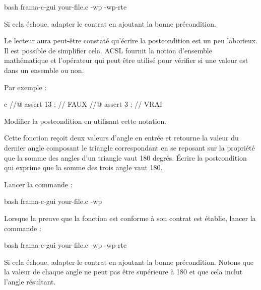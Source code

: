 \begin{CodeBlock}{bash}
frama-c-gui your-file.c -wp -wp-rte
\end{CodeBlock}


Si cela échoue, adapter le contrat en ajoutant la bonne précondition.


Le lecteur aura peut-être constaté qu'écrire la postcondition est un peu
laborieux. Il est possible de simplifier cela. ACSL fournit la notion
d'ensemble mathématique et l'opérateur  qui
peut être utilisé pour vérifier si une valeur est dans un ensemble ou non.


Par exemple :

\begin{CodeBlock}{c}
//@ assert 13  ; // FAUX
//@ assert 3   ; // VRAI
\end{CodeBlock}


Modifier la postcondition en utilisant cette notation.




Cette fonction reçoit deux valeurs d'angle en entrée et retourne
la valeur du dernier angle composant le triangle correspondant en se
reposant sur la propriété que la somme des angles d'un triangle vaut
180 degrés. Écrire la postcondition qui exprime que la somme des trois
angle vaut 180.




Lancer la commande :


\begin{CodeBlock}{bash}
frama-c-gui your-file.c -wp
\end{CodeBlock}


Lorsque la preuve que la fonction est conforme à son contrat est établie, lancer
la commande :

\begin{CodeBlock}{bash}
frama-c-gui your-file.c -wp -wp-rte
\end{CodeBlock}


Si cela échoue, adapter le contrat en ajoutant la bonne précondition.
Notons que la valeur de chaque angle ne peut pas être supérieure à 180
et que cela inclut l'angle résultant.
